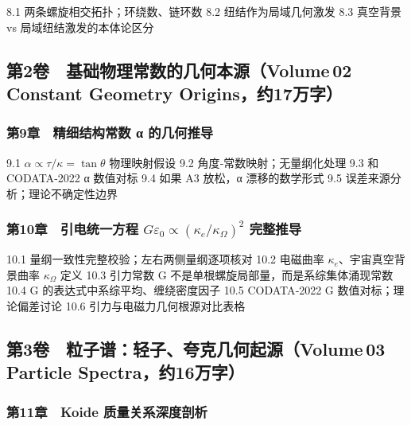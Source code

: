 8.1 两条螺旋相交拓扑；环绕数、链环数 8.2 纽结作为局域几何激发 8.3
真空背景 vs 局域纽结激发的本体论区分

\subsection{第2卷 基础物理常数的几何本源（Volume\,02 Constant Geometry
Origins，约17万字）}\label{ux7b2c2ux5377-ux57faux7840ux7269ux7406ux5e38ux6570ux7684ux51e0ux4f55ux672cux6e90volume-02-constant-geometry-originsux7ea617ux4e07ux5b57}

\subsubsection{第9章 精细结构常数 α
的几何推导}\label{ux7b2c9ux7ae0-ux7cbeux7ec6ux7ed3ux6784ux5e38ux6570-ux3b1-ux7684ux51e0ux4f55ux63a8ux5bfc}

9.1 \(\alpha \propto \tau/\kappa=\tan\theta\) 物理映射假设 9.2
角度‑常数映射；无量纲化处理 9.3 和 CODATA‑2022 α 数值对标 9.4 如果 A3
放松，α 漂移的数学形式 9.5 误差来源分析；理论不确定性边界

\subsubsection{\texorpdfstring{第10章 引电统一方程
\(G\varepsilon_0 \propto (\kappa_e/\kappa_\Omega)^2\)
完整推导}{第10章 引电统一方程 G\textbackslash varepsilon\_0 \textbackslash propto (\textbackslash kappa\_e/\textbackslash kappa\_\textbackslash Omega)\^{}2 完整推导}}\label{ux7b2c10ux7ae0-ux5f15ux7535ux7edfux4e00ux65b9ux7a0b-gvarepsilon_0-propto-kappa_ekappa_omega2-ux5b8cux6574ux63a8ux5bfc}

10.1 量纲一致性完整校验；左右两侧量纲逐项核对 10.2 电磁曲率
\(\kappa_e\)、宇宙真空背景曲率 \(\kappa_\Omega\) 定义 10.3 引力常数 G
不是单根螺旋局部量，而是系综集体涌现常数 10.4 G
的表达式中系综平均、缠绕密度因子 10.5 CODATA‑2022 G
数值对标；理论偏差讨论 10.6 引力与电磁力几何根源对比表格

\subsection{第3卷 粒子谱：轻子、夸克几何起源（Volume\,03 Particle
Spectra，约16万字）}\label{ux7b2c3ux5377-ux7c92ux5b50ux8c31ux8f7bux5b50ux5938ux514bux51e0ux4f55ux8d77ux6e90volume-03-particle-spectraux7ea616ux4e07ux5b57}

\subsubsection{第11章 Koide
质量关系深度剖析}\label{ux7b2c11ux7ae0-koide-ux8d28ux91cfux5173ux7cfbux6df1ux5ea6ux5256ux6790}

